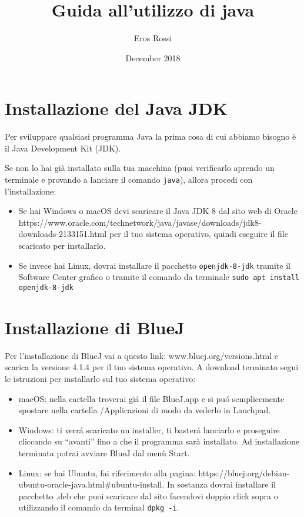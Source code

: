 \documentclass{article}
\title{Guida all'utilizzo di java}
\author{Eros Rossi}
\date{December 2018}
\begin{document}
\maketitle

\section{Installazione del Java JDK}
\noindent Per sviluppare qualsiasi programma Java la prima cosa di cui abbiamo bisogno è il Java Development Kit (JDK). 

Se non lo hai già installato sulla tua macchina (puoi verificarlo aprendo un terminale e provando a lanciare il comando \texttt{java}), allora procedi con l'installazione:

\begin{itemize}
\item Se hai Windows o macOS devi scaricare il Java JDK 8 dal sito web di Oracle https://www.oracle.com/technetwork/java/javase/downloads/jdk8-downloads-2133151.html per il tuo sistema operativo, quindi eseguire il file scaricato per installarlo. 

\item Se invece hai Linux, dovrai installare il pacchetto \texttt{openjdk-8-jdk} tramite il Software Center grafico o tramite il comando da terminale \texttt{sudo apt install openjdk-8-jdk}
\end{itemize}

\section{Installazione di BlueJ}
Per l'installazione di BlueJ vai a questo link: www.bluej.org/versions.html e scarica la versione 4.1.4 per il tuo sistema operativo.
\noindent A download terminato segui le istruzioni per installarlo sul tuo sistema operativo:

\begin{itemize}
    \item macOS: nella cartella troverai giá il file BlueJ.app e si puó semplicemente spostare nella cartella /Applicazioni di modo da vederlo in Lauchpad.
    
    \item Windows: ti verrá scaricato un installer, ti basterá lanciarlo e proseguire cliccando su ``avanti'' fino a che il programma sarà installato. Ad installazione terminata potrai avviare BlueJ dal menù Start.
    
    \item Linux: se hai Ubuntu, fai riferimento alla pagina: https://bluej.org/debian-ubuntu-oracle-java.html\#ubuntu-install. In sostanza dovrai installare il pacchetto .deb che puoi scaricare dal sito facendovi doppio click sopra o utilizzando il comando da terminal \texttt{dpkg -i}. 
\end{itemize}
\end{document}
